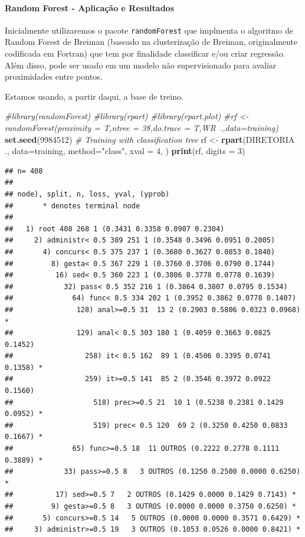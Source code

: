 \documentclass[]{article}
\newenvironment{Shaded}{\begin{snugshade}}{\end{snugshade}}
\newcommand{\CommentTok}[1]{\textcolor[rgb]{0.56,0.35,0.01}{\textit{#1}}}
\newcommand{\DataTypeTok}[1]{\textcolor[rgb]{0.13,0.29,0.53}{#1}}
\newcommand{\DecValTok}[1]{\textcolor[rgb]{0.00,0.00,0.81}{#1}}
\newcommand{\KeywordTok}[1]{\textcolor[rgb]{0.13,0.29,0.53}{\textbf{#1}}}
\newcommand{\NormalTok}[1]{#1}
\newcommand{\OperatorTok}[1]{\textcolor[rgb]{0.81,0.36,0.00}{\textbf{#1}}}
\newcommand{\StringTok}[1]{\textcolor[rgb]{0.31,0.60,0.02}{#1}}
\let\oldparagraph\paragraph
\renewcommand{\paragraph}[1]{\oldparagraph{#1}\mbox{}}
\begin{document}
\hypertarget{random-forest---aplicacao-e-resultados}{%
\paragraph{Random Forest - Aplicação e
Resultados}\label{random-forest---aplicacao-e-resultados}}

Inicialmente utilizaremos o pacote \texttt{randomForest} que implmenta o
algoritmo de Random Forest de Breiman (baseado na clusterização de
Breiman, originalmente codificada em Fortran) que tem por finalidade
classificar e/ou criar regressão. Além disso, pode ser usado em um
modelo não supervisionado para avaliar proximidades entre pontos.

Estamos usando, a partir daqui, a base de treino.

\begin{Shaded}
\begin{Highlighting}[]
\CommentTok{#library(randomForest)}
\CommentTok{#library(rpart)}
\CommentTok{#library(rpart.plot)}
\CommentTok{#rf <- randomForest(proximity = T,ntree = 38,do.trace = T,WR~.,data=training)}
\KeywordTok{set.seed}\NormalTok{(}\DecValTok{9984512}\NormalTok{)}
\CommentTok{# Training with classification tree}
\NormalTok{rf <-}\StringTok{ }\KeywordTok{rpart}\NormalTok{(DIRETORIA }\OperatorTok{~}\StringTok{ }\NormalTok{., }\DataTypeTok{data=}\NormalTok{training, }\DataTypeTok{method=}\StringTok{"class"}\NormalTok{, }\DataTypeTok{xval =} \DecValTok{4}\NormalTok{, )}
\KeywordTok{print}\NormalTok{(rf, }\DataTypeTok{digits =} \DecValTok{3}\NormalTok{)}
\end{Highlighting}
\end{Shaded}

\begin{verbatim}
## n= 408 
## 
## node), split, n, loss, yval, (yprob)
##       * denotes terminal node
## 
##   1) root 408 268 1 (0.3431 0.3358 0.0907 0.2304)  
##     2) administr< 0.5 389 251 1 (0.3548 0.3496 0.0951 0.2005)  
##       4) concurs< 0.5 375 237 1 (0.3680 0.3627 0.0853 0.1840)  
##         8) gesta< 0.5 367 229 1 (0.3760 0.3706 0.0790 0.1744)  
##          16) sed< 0.5 360 223 1 (0.3806 0.3778 0.0778 0.1639)  
##            32) pass< 0.5 352 216 1 (0.3864 0.3807 0.0795 0.1534)  
##              64) func< 0.5 334 202 1 (0.3952 0.3862 0.0778 0.1407)  
##               128) anal>=0.5 31  13 2 (0.2903 0.5806 0.0323 0.0968) *
##               129) anal< 0.5 303 180 1 (0.4059 0.3663 0.0825 0.1452)  
##                 258) it< 0.5 162  89 1 (0.4506 0.3395 0.0741 0.1358) *
##                 259) it>=0.5 141  85 2 (0.3546 0.3972 0.0922 0.1560)  
##                   518) prec>=0.5 21  10 1 (0.5238 0.2381 0.1429 0.0952) *
##                   519) prec< 0.5 120  69 2 (0.3250 0.4250 0.0833 0.1667) *
##              65) func>=0.5 18  11 OUTROS (0.2222 0.2778 0.1111 0.3889) *
##            33) pass>=0.5 8   3 OUTROS (0.1250 0.2500 0.0000 0.6250) *
##          17) sed>=0.5 7   2 OUTROS (0.1429 0.0000 0.1429 0.7143) *
##         9) gesta>=0.5 8   3 OUTROS (0.0000 0.0000 0.3750 0.6250) *
##       5) concurs>=0.5 14   5 OUTROS (0.0000 0.0000 0.3571 0.6429) *
##     3) administr>=0.5 19   3 OUTROS (0.1053 0.0526 0.0000 0.8421) *
\end{verbatim}
\end{document}
